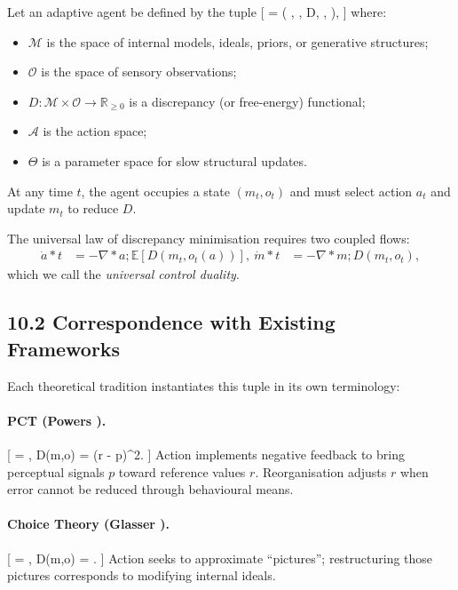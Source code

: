 \documentclass[11pt,a4paper,twoside]{article}
\begin{document}
Let an adaptive agent be defined by the tuple
[
 = \big( , , D, , \Theta \big),
]
where:
\begin{itemize}
\item $\mathcal{M}$ is the space of internal models, ideals, priors, or generative structures;
\item $\mathcal{O}$ is the space of sensory observations;
\item $D : \mathcal{M} \times \mathcal{O} \to \mathbb{R}_{\ge 0}$ is a discrepancy (or free-energy) functional;
\item $\mathcal{A}$ is the action space;
\item $\Theta$ is a parameter space for slow structural updates.
\end{itemize}

At any time $t$, the agent occupies a state $(m_t, o_t)$ and must select action $a_t$ and update $m_t$ to reduce $D$.

The universal law of discrepancy minimisation requires two coupled flows:
\begin{align}
\dot{a}*t &= - \nabla*{a} ; \mathbb{E}[D(m_t, o_t(a))], \label{eq:unified_action} \
\dot{m}*t &= - \nabla*{m} ; D(m_t, o_t), \label{eq:unified_model}
\end{align}
which we call the \emph{universal control duality}.

\subsection{10.2 Correspondence with Existing Frameworks}

Each theoretical tradition instantiates this tuple in its own terminology:

\paragraph{PCT (Powers \cite{powers1973behavior,powers2005behavior}).}
[
 = {}, \qquad
D(m,o) = (r - p)^2.
]
Action implements negative feedback to bring perceptual signals $p$ toward reference values $r$. Reorganisation adjusts $r$ when error cannot be reduced through behavioural means.

\paragraph{Choice Theory (Glasser \cite{glasser1998choice,glasser1981stations}).}
[
 = {}, \qquad
D(m,o) = .
]
Action seeks to approximate ``pictures''; restructuring those pictures corresponds to modifying internal ideals.
\end{document}
